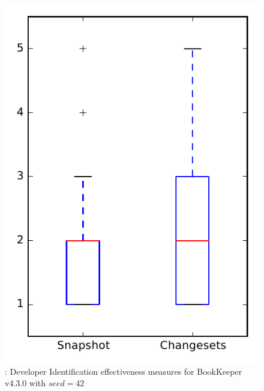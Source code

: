 
\begin{figure}
\centering
\includegraphics[height=0.4\textheight]{figures/dit_seed/rq1_bookkeeper_42}
\caption{\rtwo: Developer Identification effectiveness measures for BookKeeper v4.3.0 with $seed=42$}
\label{fig:dit_seed:rq1:bookkeeper}
\end{figure}

